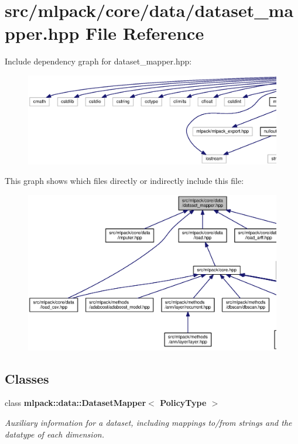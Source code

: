\section{src/mlpack/core/data/dataset\+\_\+mapper.hpp File Reference}
\label{dataset__mapper_8hpp}
Include dependency graph for dataset\+\_\+mapper.\+hpp\+:
\nopagebreak
\begin{figure}[H]
\begin{center}
\leavevmode
\includegraphics[width=350pt]{dataset__mapper_8hpp__incl}
\end{center}
\end{figure}
This graph shows which files directly or indirectly include this file\+:
\nopagebreak
\begin{figure}[H]
\begin{center}
\leavevmode
\includegraphics[width=350pt]{dataset__mapper_8hpp__dep__incl}
\end{center}
\end{figure}
\subsection*{Classes}
\begin{DoxyCompactItemize}
\item 
class {\bf mlpack\+::data\+::\+Dataset\+Mapper$<$ Policy\+Type $>$}
\begin{DoxyCompactList}\small\item\em Auxiliary information for a dataset, including mappings to/from strings and the datatype of each dimension. \end{DoxyCompactList}\end{DoxyCompactItemize}
